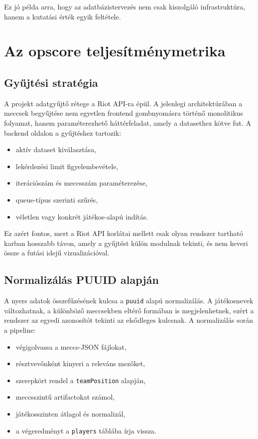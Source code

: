 ﻿\documentclass[a4paper,12pt]{report}
\begin{document}
Ez jó példa arra, hogy az adatbázistervezés nem csak kiszolgáló infrastruktúra, hanem a kutatási érték egyik feltétele.

\chapter{Az opscore teljesítménymetrika}

\section{Gyűjtési stratégia}

A projekt adatgyűjtő rétege a Riot API-ra épül. A jelenlegi architektúrában a meccsek begyűjtése nem egyetlen frontend gombnyomásra történő monolitikus folyamat, hanem paraméterezhető háttérfeladat, amely a datasethez kötve fut. A backend oldalon a gyűjtéshez tartozik:

\begin{itemize}
    \item aktív dataset kiválasztása,
    \item lekérdezési limit figyelembevétele,
    \item iterációszám és meccsszám paraméterezése,
    \item queue-típus szerinti szűrés,
    \item véletlen vagy konkrét játékos-alapú indítás.
\end{itemize}

Ez azért fontos, mert a Riot API korlátai mellett csak olyan rendszer tartható karban hosszabb távon, amely a gyűjtést külön modulnak tekinti, és nem keveri össze a futási idejű vizualizációval.

\section{Normalizálás PUUID alapján}

A nyers adatok összefűzésének kulcsa a \texttt{puuid} alapú normalizálás. A játékosnevek változhatnak, a különböző meccsekben eltérő formában is megjelenhetnek, ezért a rendszer az egyedi azonosítót tekinti az elsődleges kulcsnak. A normalizálás során a pipeline:

\begin{itemize}
    \item végigolvassa a meccs-JSON fájlokat,
    \item résztvevőnként kinyeri a releváns mezőket,
    \item szerepkört rendel a \texttt{teamPosition} alapján,
    \item meccsszintű artifactokat számol,
    \item játékosszinten átlagol és normalizál,
    \item a végeredményt a \texttt{players} táblába írja vissza.
\end{itemize}
\end{document}
